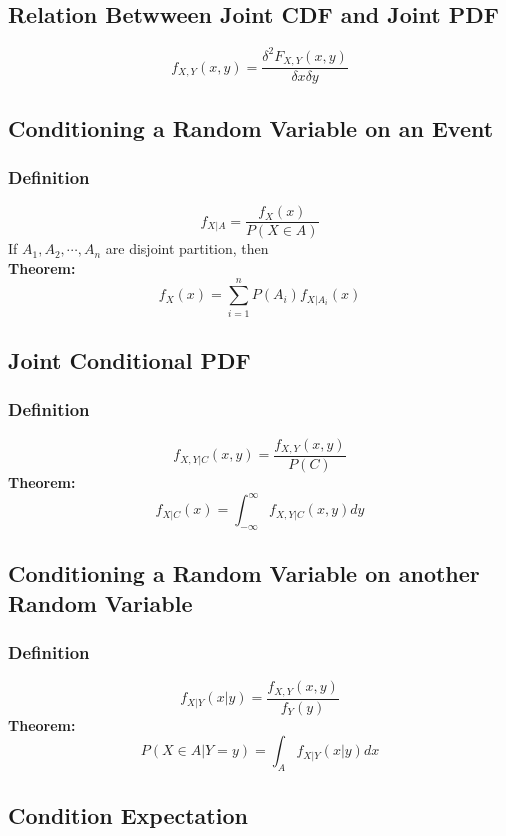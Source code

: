 \documentclass[11pt]{article}
\begin{document}
\subsection{Relation Betwween Joint CDF and Joint PDF}
$$f_{X,Y}(x,y) = \frac{\delta^2 F_{X,Y}(x,y)}{\delta x \delta y}$$

\subsection{Conditioning a Random Variable on an Event}
\subsubsection{Definition}
$$f_{X|A} = \frac{f_X(x)}{P(X\in A)}$$
\indent If $A_1 , A_2 , \cdots , A_n$ are disjoint partition, then\\
\noindent \textbf{Theorem:}\\
$$f_X(x) = \underset{i=1}{\sum^n} P(A_i) f_{X|A_i}(x)$$

\subsection{Joint Conditional PDF}
\subsubsection{Definition}
$$f_{X,Y|C}(x,y) = \frac{f_{X,Y}(x,y)}{P(C)}$$
\noindent \textbf{Theorem:}\\
$$f_{X|C}(x) = \int_{-\infty}^{\infty} f_{X,Y|C}(x,y)dy$$

\subsection{Conditioning a Random Variable on another Random Variable}
\subsubsection{Definition}
$$f_{X|Y}(x|y) = \frac{f_{X,Y}(x,y)}{f_Y(y)}$$
\noindent \textbf{Theorem:}\\
$$P(X\in A | Y=y) = \int_A f_{X|Y}(x|y)dx$$

\subsection{Condition Expectation}
\end{document}
